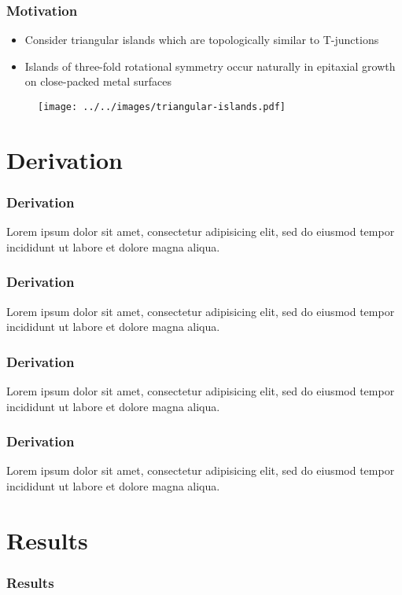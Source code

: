 \documentclass[xcolor=dvipsnames,9pt]{beamer}
\newcommand{\MO}{Motivation}
\newcommand{\DE}{Derivation}
\newcommand{\RE}{Results}
\begin{document}
  \begin{frame}
    \frametitle{\MO}
    \begin{multicols}{2}

    \begin{itemize}
      \item Consider triangular islands which are topologically similar to T-junctions 
      \item Islands of three-fold rotational symmetry occur naturally in epitaxial growth on close-packed metal surfaces
    \end{itemize}

    \begin{figure}
      \texttt{[image: ../../images/triangular-islands.pdf]}
    \end{figure}
    \end{multicols}
  \end{frame}

  \section{\DE}
  \begin{frame}
    \frametitle{\DE}
    Lorem ipsum dolor sit amet, consectetur adipisicing elit, sed do eiusmod tempor incididunt ut labore et dolore magna aliqua.
  \end{frame}

  \begin{frame}
    \frametitle{\DE}
    Lorem ipsum dolor sit amet, consectetur adipisicing elit, sed do eiusmod tempor incididunt ut labore et dolore magna aliqua.
  \end{frame}

  \begin{frame}
    \frametitle{\DE}
    Lorem ipsum dolor sit amet, consectetur adipisicing elit, sed do eiusmod tempor incididunt ut labore et dolore magna aliqua.
  \end{frame}

  \begin{frame}
    \frametitle{\DE}
    Lorem ipsum dolor sit amet, consectetur adipisicing elit, sed do eiusmod tempor incididunt ut labore et dolore magna aliqua.
  \end{frame}

  \section{\RE}
  \begin{frame}
    \frametitle{\RE}

    \begin{figure}
    \end{figure}

  \end{frame}
\end{document}
